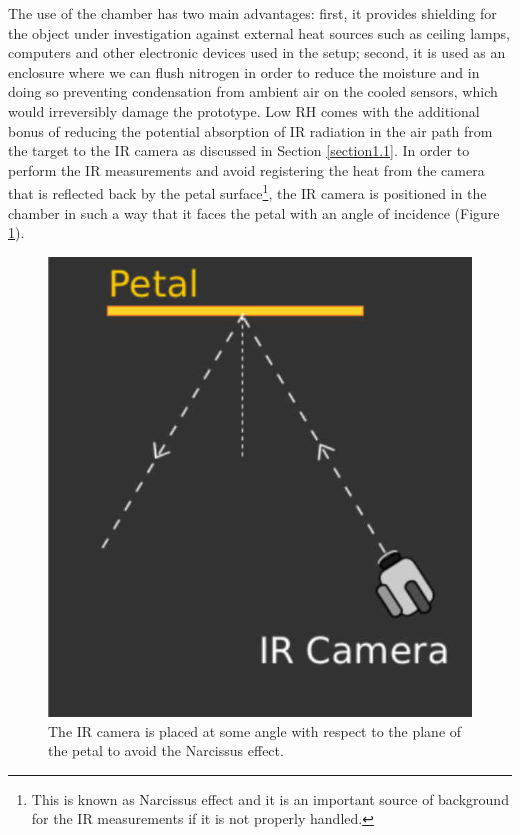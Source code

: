 		The use of the chamber has two main advantages: first, it provides shielding for the object under investigation against external heat sources such as ceiling lamps, computers and other electronic devices used in the setup; second, it is used as an enclosure where we can flush nitrogen in order to reduce the moisture and in doing so preventing condensation from ambient air on the cooled sensors, which would irreversibly damage the prototype. Low RH comes with the additional bonus of reducing the potential absorption of IR radiation in the air path from the target to the IR camera as discussed in Section \ref{section1.1}.
		In order to perform the IR measurements and avoid registering the heat from the camera that is reflected back by the petal surface\footnote{{\footnotesize This is known as Narcissus effect and it is an important source of background for the IR measurements if it is not properly handled.}}, the IR camera is positioned in the chamber in such a way that it faces the petal with an angle of incidence (Figure \ref{fig2.4}).	
		
		\begin{figure}[ht!]
			\centering
			\captionsetup{justification=centering,margin=2cm}
			\includegraphics[scale=0.25]{Figures/Chapter02/NarcissusEffect.jpg}
			\caption{The IR camera is placed at some angle with respect to the plane of the petal to avoid the Narcissus effect.}\label{fig2.4}
		\end{figure}\bigskip
		
